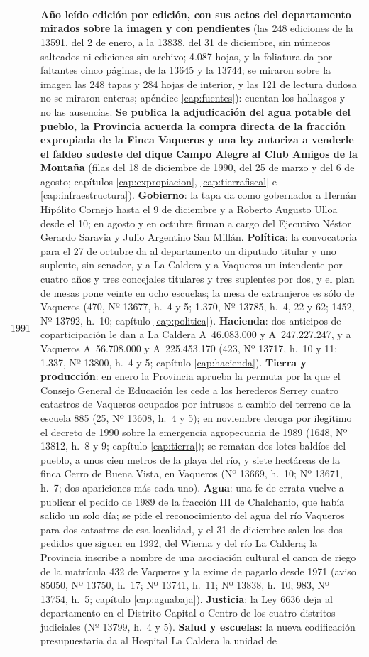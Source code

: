 \begin{longtable}{@{}p{2.7cm}p{10.3cm}@{}}
1991 & \textbf{Año leído edición por edición, con sus actos del departamento mirados sobre la imagen y con pendientes} (las 248 ediciones de la 13591, del 2 de enero, a la 13838, del 31 de diciembre, sin números salteados ni ediciones sin archivo; 4.087 hojas, y la foliatura da por faltantes cinco páginas, de la 13645 y la 13744; se miraron sobre la imagen las 248 tapas y 284 hojas de interior, y las 121 de lectura dudosa no se miraron enteras; apéndice \ref{cap:fuentes}): cuentan los hallazgos y no las ausencias. \textbf{Se publica la adjudicación del agua potable del pueblo, la Provincia acuerda la compra directa de la fracción expropiada de la Finca Vaqueros y una ley autoriza a venderle el faldeo sudeste del dique Campo Alegre al Club Amigos de la Montaña} (filas del 18 de diciembre de 1990, del 25 de marzo y del 6 de agosto; capítulos \ref{cap:expropiacion}, \ref{cap:tierrafiscal} e \ref{cap:infraestructura}). \textbf{Gobierno}: la tapa da como gobernador a Hernán Hipólito Cornejo hasta el 9 de diciembre y a Roberto Augusto Ulloa desde el 10; en agosto y en octubre firman a cargo del Ejecutivo Néstor Gerardo Saravia y Julio Argentino San Millán. \textbf{Política}: la convocatoria para el 27 de octubre da al departamento un diputado titular y uno suplente, sin senador, y a La Caldera y a Vaqueros un intendente por cuatro años y tres concejales titulares y tres suplentes por dos, y el plan de mesas pone veinte en ocho escuelas; la mesa de extranjeros es sólo de Vaqueros (470, Nº 13677, h.\ 4 y 5; 1.370, Nº 13785, h.\ 4, 22 y 62; 1452, Nº 13792, h.\ 10; capítulo \ref{cap:politica}). \textbf{Hacienda}: dos anticipos de coparticipación le dan a La Caldera A~46.083.000 y A~247.227.247, y a Vaqueros A~56.708.000 y A~225.453.170 (423, Nº 13717, h.\ 10 y 11; 1.337, Nº 13800, h.\ 4 y 5; capítulo \ref{cap:hacienda}). \textbf{Tierra y producción}: en enero la Provincia aprueba la permuta por la que el Consejo General de Educación les cede a los herederos Serrey cuatro catastros de Vaqueros ocupados por intrusos a cambio del terreno de la escuela 885 (25, Nº 13608, h.\ 4 y 5); en noviembre deroga por ilegítimo el decreto de 1990 sobre la emergencia agropecuaria de 1989 (1648, Nº 13812, h.\ 8 y 9; capítulo \ref{cap:tierra}); se rematan dos lotes baldíos del pueblo, a unos cien metros de la playa del río, y siete hectáreas de la finca Cerro de Buena Vista, en Vaqueros (Nº 13669, h.\ 10; Nº 13671, h.\ 7; dos apariciones más cada uno). \textbf{Agua}: una fe de errata vuelve a publicar el pedido de 1989 de la fracción III de Chalchanio, que había salido un solo día; se pide el reconocimiento del agua del río Vaqueros para dos catastros de esa localidad, y el 31 de diciembre salen los dos pedidos que siguen en 1992, del Wierna y del río La Caldera; la Provincia inscribe a nombre de una asociación cultural el canon de riego de la matrícula 432 de Vaqueros y la exime de pagarlo desde 1971 (aviso 85050, Nº 13750, h.\ 17; Nº 13741, h.\ 11; Nº 13838, h.\ 10; 983, Nº 13754, h.\ 5; capítulo \ref{cap:aguabaja}). \textbf{Justicia}: la Ley 6636 deja al departamento en el Distrito Capital o Centro de los cuatro distritos judiciales (Nº 13799, h.\ 4 y 5). \textbf{Salud y escuelas}: la nueva codificación presupuestaria da al Hospital La Caldera la unidad de 
\end{longtable}
